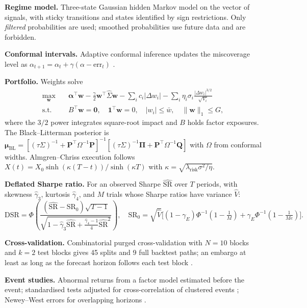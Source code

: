 \documentclass[11pt,a4paper]{article}
\theoremstyle{plain}
\theoremstyle{definition}
\newcommand{\w}{\bm{w}}
\begin{document}
\textbf{Regime model.} Three-state Gaussian hidden Markov model on the vector of signals, with sticky transitions and states identified by sign restrictions. Only \emph{filtered} probabilities are used; smoothed probabilities use future data and are forbidden.

\textbf{Conformal intervals.} Adaptive conformal inference updates the miscoverage level as $\alpha_{t+1}=\alpha_t+\gamma(\alpha-\mathrm{err}_t)$ \citep{gibbs2021,angelopoulos2021}.

\textbf{Portfolio.} Weights solve
\begin{align*}
\max_{\w}\quad & \bm\alpha^\top\w-\tfrac{\gamma}{2}\w^\top\hat\Sigma\w-\sum_i c_i|\Delta w_i|-\sum_i\eta_i\sigma_i\frac{|\Delta w_i|^{3/2}}{\sqrt{V_i}}\\
\text{s.t.}\quad & B^\top\w=\bm 0,\quad \bm 1^\top\w=0,\quad |w_i|\le\bar w,\quad \|\w\|_1\le G,
\end{align*}
where the $3/2$ power integrates square-root impact and $B$ holds factor exposures. The Black--Litterman posterior is $\bm\mu_{\text{BL}}=[(\tau\Sigma)^{-1}+\bm P^\top\Omega^{-1}\bm P]^{-1}[(\tau\Sigma)^{-1}\bm\Pi+\bm P^\top\Omega^{-1}\bm Q]$ with $\Omega$ from conformal widths. Almgren--Chriss execution follows $X(t)=X_0\sinh(\kappa(T-t))/\sinh(\kappa T)$ with $\kappa=\sqrt{\lambda_{\text{risk}}\sigma^2/\eta}$.

\textbf{Deflated Sharpe ratio.} For an observed Sharpe $\widehat{\mathrm{SR}}$ over $T$ periods, with skewness $\hat\gamma_3$, kurtosis $\hat\gamma_4$, and $M$ trials whose Sharpe ratios have variance $\widehat V$:
\[
\mathrm{DSR}=\Phi\!\left(\frac{(\widehat{\mathrm{SR}}-\mathrm{SR}_0)\sqrt{T-1}}{\sqrt{1-\hat\gamma_3\widehat{\mathrm{SR}}+\frac{\hat\gamma_4-1}{4}\widehat{\mathrm{SR}}^2}}\right),\quad
\mathrm{SR}_0=\sqrt{\widehat V}\Big[(1-\gamma_E)\Phi^{-1}(1-\tfrac1M)+\gamma_E\Phi^{-1}(1-\tfrac{1}{Me})\Big].
\]

\textbf{Cross-validation.} Combinatorial purged cross-validation with $N=10$ blocks and $k=2$ test blocks gives 45 splits and 9 full backtest paths; an embargo at least as long as the forecast horizon follows each test block \citep{lopezdeprado2018}.

\textbf{Event studies.} Abnormal returns from a factor model estimated before the event; standardised tests \citep{boehmer1991} adjusted for cross-correlation of clustered events \citep{kolari2010}; Newey--West errors for overlapping horizons \citep{newey1987}.

\end{document}
